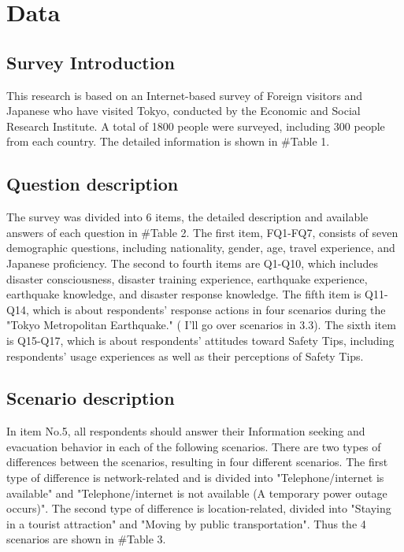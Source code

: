 

\chapter{Data}

\section{Survey Introduction}
This research is based on an Internet-based survey of Foreign visitors and Japanese who have visited Tokyo, conducted by the Economic and Social Research Institute. A total of 1800 people were surveyed, including 300 people from each country. The detailed information is shown in \#Table 1. 

\section{Question description}
The survey was divided into 6 items, the detailed description and available answers of each question in \#Table 2. The first item, FQ1-FQ7, consists of seven demographic questions, including nationality, gender, age, travel experience, and Japanese proficiency. The second to fourth items are Q1-Q10, which includes disaster consciousness, disaster training experience, earthquake experience, earthquake knowledge, and disaster response knowledge. The fifth item is Q11-Q14, which is about respondents' response actions in four scenarios during the "Tokyo Metropolitan Earthquake." ( I'll go over scenarios in 3.3). The sixth item is Q15-Q17, which is about respondents' attitudes toward Safety Tips, including respondents' usage experiences as well as their perceptions of Safety Tips.

\section{Scenario description}
In item No.5, all respondents should answer their Information seeking and evacuation behavior in each of the following scenarios. There are two types of differences between the scenarios, resulting in four different scenarios. The first type of difference is network-related and is divided into "Telephone/internet is available" and "Telephone/internet is not available (A temporary power outage occurs)". The second type of difference is location-related, divided into "Staying in a tourist attraction" and "Moving by public transportation". Thus the 4 scenarios are shown in \#Table 3.


